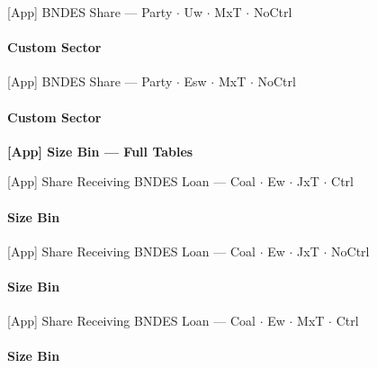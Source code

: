 \documentclass[aspectratio=169,10pt]{beamer}
\newcommand{\tgroup}{../tables/agg_firm_grouped}
\newcommand{\tsize}{../tables/agg_firm_size_bin}
\begin{document}
\begin{frame}[t,shrink=5]{[App] BNDES Share --- Party $\cdot$ Uw $\cdot$ MxT $\cdot$ NoCtrl}
\framesubtitle{Custom Sector}
\begin{center}\footnotesize

\end{center}
\end{frame}

\begin{frame}[t,shrink=5]{[App] BNDES Share --- Party $\cdot$ Esw $\cdot$ MxT $\cdot$ NoCtrl}
\framesubtitle{Custom Sector}
\begin{center}\footnotesize

\end{center}
\end{frame}

\begin{frame}[plain]
\begin{center}
{\Large\textbf{[App] Size Bin --- Full Tables}}
\end{center}
\end{frame}

\begin{frame}[t,shrink=5]{[App] Share Receiving BNDES Loan --- Coal $\cdot$ Ew $\cdot$ JxT $\cdot$ Ctrl}
\framesubtitle{Size Bin}
\begin{center}\footnotesize

\end{center}
\end{frame}

\begin{frame}[t,shrink=5]{[App] Share Receiving BNDES Loan --- Coal $\cdot$ Ew $\cdot$ JxT $\cdot$ NoCtrl}
\framesubtitle{Size Bin}
\begin{center}\footnotesize

\end{center}
\end{frame}

\begin{frame}[t,shrink=5]{[App] Share Receiving BNDES Loan --- Coal $\cdot$ Ew $\cdot$ MxT $\cdot$ Ctrl}
\framesubtitle{Size Bin}
\begin{center}\footnotesize

\end{center}
\end{frame}
\end{document}
